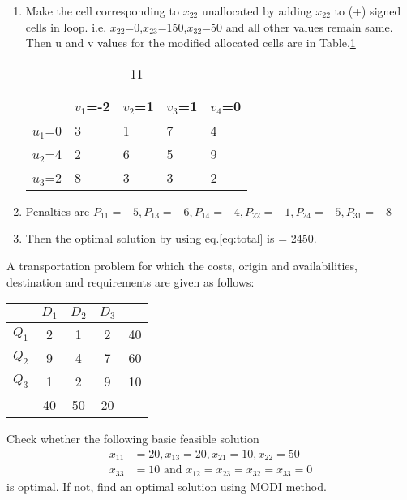 \documentclass[journal,12pt,twocolumn]{IEEEtran}
\begin{document}
\begin{enumerate}[1.]
\item 
Make the cell corresponding to $x_{22}$ unallocated by adding $x_{22}$ to (+) signed cells in loop. i.e. $x_{22}$=0,$x_{23}$=150,$x_{32}$=50 and all other values remain same. Then u and v values for the modified allocated cells are in Table.\ref{table11}

\begin{table}[!h]
\begin{center}
\begin{tabular}{| l | l | l | l | l | }
                 \hline
                   & $v_1$=-2 & $v_2$=1 & $v_3$=1 & $v_4$=0  \\
\hline
$u_1$=0 & 3 & 1 & 7 & 4  \\ \hline
$u_2$=4 & 2 & 6 & 5 & 9   \\ \hline
$u_3$=2 & 8 & 3 & 3 & 2  \\ \hline

\end{tabular}
\end{center}
\caption{11}
\label{table11}
\end{table}

\item Penalties are
$
P_{11}=-5,
P_{13}=-6,
P_{14}=-4,
P_{22}=-1,
P_{24}=-5,
P_{31}=-8
$

\item Then the optimal solution by using eq.\eqref{eq:total} is = 2450.
\end{enumerate}
\begin{problem}
A transportation problem for which the costs, origin and availabilities, destination and requirements are given as follows:\\
\bigskip

\begin{center}
\begin{tabular}{c|c c c|c}
 & $D_1$ & $D_2$ & $D_3$\\ \hline
$Q_1$ & 2 & 1 & 2 & 40\\
$Q_2$ & 9 & 4 & 7 & 60\\
$Q_3$ & 1 & 2 & 9 & 10\\ \hline
 & 40 & 50 & 20\\
\end{tabular}
\end{center}
\bigskip
Check whether the following basic feasible solution
\begin{align*}
x_{11}&=20,x_{13}=20,x_{21}=10,x_{22}=50
\\
x_{33}&=10 \text{ and } x_{12}=x_{23}=x_{32}=x_{33}=0
\end{align*}
is optimal. If not, find an optimal solution using MODI method.
\end{problem}
\end{document}
